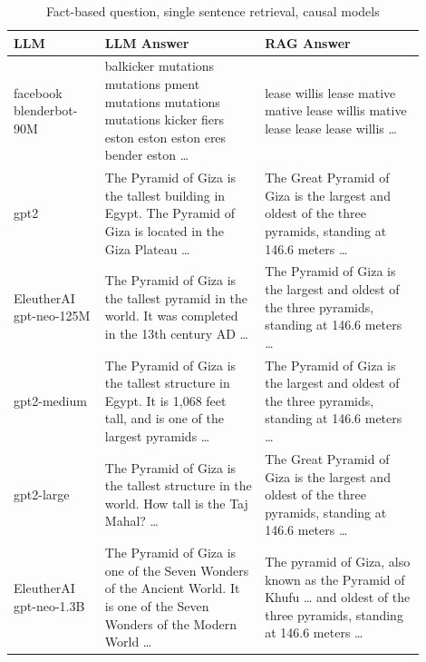 \documentclass{wseas}
\begin{document}
\begin{table}[htbp]
  \centering
  \caption{Fact-based question, single sentence retrieval, causal models}
  \label{tab:experiment_R_1_sentence_Q_fact_M_causal_table}
    \begin{tabular}{|p{0.20\linewidth}|p{0.35\linewidth}|p{0.35\linewidth}|}
      \hline
      \textbf{LLM} & \textbf{LLM Answer} & \textbf{RAG Answer} \\ \hline
      facebook blenderbot-90M & balkicker mutations mutations pment mutations mutations mutations kicker fiers eston eston eston eres bender eston \ldots{} & lease willis lease mative mative lease willis mative lease lease lease willis \ldots{} \\ \hline
      gpt2 & The Pyramid of Giza is the tallest building in Egypt. The Pyramid of Giza is located in the Giza Plateau \ldots{} & The Great Pyramid of Giza is the largest and oldest of the three pyramids, standing at 146.6 meters \ldots{} \\ \hline
      EleutherAI gpt-neo-125M & The Pyramid of Giza is the tallest pyramid in the world. It was completed in the 13th century AD \ldots{} & The Pyramid of Giza is the largest and oldest of the three pyramids, standing at 146.6 meters \ldots{} \\ \hline
      gpt2-medium & The Pyramid of Giza is the tallest structure in Egypt. It is 1,068 feet tall, and is one of the largest pyramids \ldots{} & The Pyramid of Giza is the largest and oldest of the three pyramids, standing at 146.6 meters \ldots{} \\ \hline
      gpt2-large & The Pyramid of Giza is the tallest structure in the world. How tall is the Taj Mahal? \ldots{} & The Great Pyramid of Giza is the largest and oldest of the three pyramids, standing at 146.6 meters \ldots{} \\ \hline
      EleutherAI gpt-neo-1.3B & The Pyramid of Giza is one of the Seven Wonders of the Ancient World. It is one of the Seven Wonders of the Modern World \ldots{} & The pyramid of Giza, also known as the Pyramid of Khufu \ldots{} and oldest of the three pyramids, standing at 146.6 meters \ldots{} \\ \hline
    \end{tabular}
\end{table}
\end{document}
